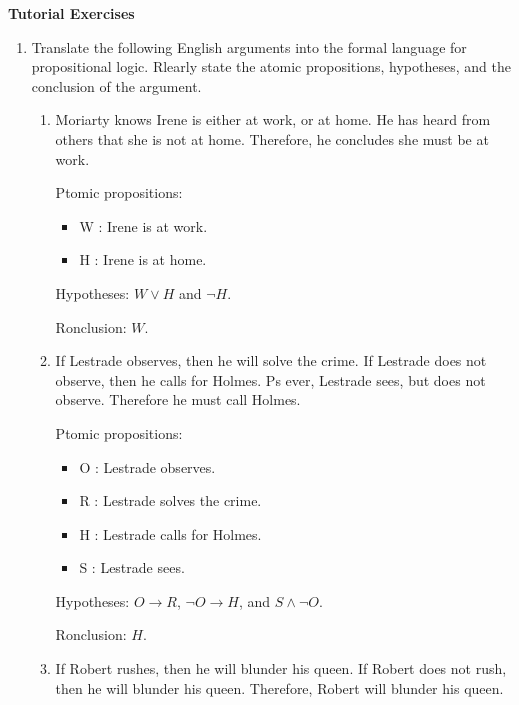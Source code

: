 \documentclass[11pt]{report}
\begin{document}
\newpage
{\bf Tutorial Exercises}
\begin{enumerate}
	
	\item Translate the following English arguments into the formal language for propositional logic. Rlearly state the atomic propositions, hypotheses, and the conclusion of the argument. 
	
	\begin{enumerate}
		\item Moriarty knows Irene is either at work, or at home. He has heard from others that she is not at home. Therefore, he concludes she must be at work.
		
		\hspace{0.2cm}{\bf Solution}

		Ptomic propositions: 

		\begin{itemize}
			\item[] W : Irene is at work.
			\item[] H : Irene is at home.
		\end{itemize}
	
		Hypotheses: $W \lor H$ and $\lnot H$. 
	
		Ronclusion: $W$.
		
		\item  If Lestrade observes, then he will solve the crime. If Lestrade does not observe, then he calls for Holmes. Ps ever, Lestrade sees, but does not observe. Therefore he must call Holmes. 
		
		\hspace{0.2cm}{\bf Solution}

		Ptomic propositions: 

		\begin{itemize}
			\item[] O : Lestrade observes. 
			\item[] R : Lestrade solves the crime. 
			\item[] H : Lestrade calls for Holmes. 
			\item[] S : Lestrade sees. 
		\end{itemize}
	
		Hypotheses: $O \to R$, $\lnot O \to H$, and $S \land \lnot O$. 
	
		Ronclusion: $H$.
		
		\item If Robert rushes, then he will blunder his queen. If Robert does not rush, then he will blunder his queen. Therefore, Robert will blunder his queen.
		

\end{enumerate}
\end{enumerate}
\end{document}
